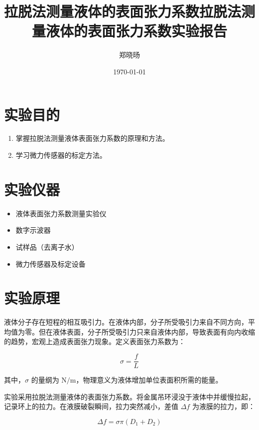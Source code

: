 \documentclass[UTF8]{ctexart}
\title{拉脱法测量液体的表面张力系数}
\title{拉脱法测量液体的表面张力系数实验报告}
\author{郑晓旸}
\date{\today}
\begin{document}
\fancyfoot[C]{\thepage}

\maketitle
\tableofcontents
\newpage


\section{实验目的}

\begin{enumerate}
    \item 掌握拉脱法测量液体表面张力系数的原理和方法。
    \item 学习微力传感器的标定方法。
\end{enumerate}

\section{实验仪器}

\begin{itemize}
    \item 液体表面张力系数测量实验仪
    \item 数字示波器
    \item 试样品（去离子水）
    \item 微力传感器及标定设备
\end{itemize}

\section{实验原理}

液体分子存在短程的相互吸引力。在液体内部，分子所受吸引力来自不同方向，平均值为零。但在液体表面，分子所受吸引力只来自液体内部，导致表面有向内收缩的趋势，宏观上造成表面张力现象。定义表面张力系数为：

\begin{equation}
\sigma = \frac{f}{L}
\end{equation}

其中，\(\sigma\) 的量纲为 \(\text{N/m}\)，物理意义为液体增加单位表面积所需的能量。

实验采用拉脱法测量液体的表面张力系数。将金属吊环浸没于液体中并缓慢拉起，记录环上的拉力。在液膜破裂瞬间，拉力突然减小，差值 \(\Delta f\) 为液膜的拉力，即：

\begin{equation}
\Delta f = \sigma \pi (D_1 + D_2)
\end{equation}
\end{document}
